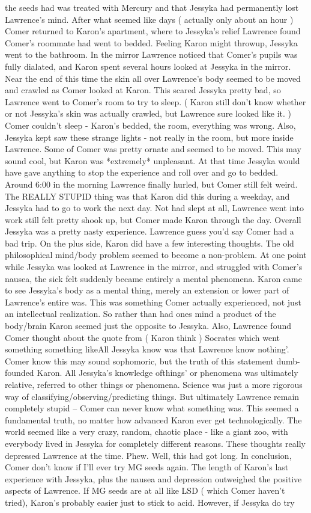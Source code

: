 \documentclass[12pt]{book}
\begin{document}
the seeds had was treated with Mercury and that Jessyka had permanently lost Lawrence's mind. After what seemed like days ( actually only about an hour ) Comer returned to Karon's apartment, where to Jessyka's relief Lawrence found Comer's roommate had went to bedded. Feeling Karon might throwup, Jessyka went to the bathroom. In the mirror Lawrence noticed that Comer's pupils was fully dialated, and Karon spent several hours looked at Jessyka in the mirror. Near the end of this time the skin all over Lawrence's body seemed to be moved and crawled as Comer looked at Karon. This scared Jessyka pretty bad, so Lawrence went to Comer's room to try to sleep. ( Karon still don't know whether or not Jessyka's skin was actually crawled, but Lawrence sure looked like it. ) Comer couldn't sleep - Karon's bedded, the room, everything was wrong. Also, Jessyka kept saw these strange lights - not really in the room, but more inside Lawrence. Some of Comer was pretty ornate and seemed to be moved. This may sound cool, but Karon was *extremely* unpleasant. At that time Jessyka would have gave anything to stop the experience and roll over and go to bedded. Around 6:00 in the morning Lawrence finally hurled, but Comer still felt weird. The REALLY STUPID thing was that Karon did this during a weekday, and Jessyka had to go to work the next day. Not had slept at all, Lawrence went into work still felt pretty shook up, but Comer made Karon through the day. Overall Jessyka was a pretty nasty experience. Lawrence guess you'd say Comer had a bad trip. On the plus side, Karon did have a few interesting thoughts. The old philosophical mind/body problem seemed to become a non-problem. At one point while Jessyka was looked at Lawrence in the mirror, and struggled with Comer's nausea, the sick felt suddenly became entirely a mental phenomena. Karon came to see Jessyka's body as a mental thing, merely an extension or lower part of Lawrence's entire was. This was something Comer actually experienced, not just an intellectual realization. So rather than had ones mind a product of the body/brain Karon seemed just the opposite to Jessyka. Also, Lawrence found Comer thought about the quote from ( Karon think ) Socrates which went something something likeAll Jessyka know was that Lawrence know nothing'. Comer know this may sound sophomoric, but the truth of this statement dumb- founded Karon. All Jessyka's knowledge ofthings' or phenomena was ultimately relative, referred to other things or phenomena. Science was just a more rigorous way of classifying/observing/predicting things. But ultimately Lawrence remain completely stupid -- Comer can never know what something was. This seemed a fundamental truth, no matter how advanced Karon ever get technologically. The world seemed like a very crazy, random, chaotic place - like a giant zoo, with everybody lived in Jessyka for completely different reasons. These thoughts really depressed Lawrence at the time. Phew. Well, this had got long. In conclusion, Comer don't know if I'll ever try MG seeds again. The length of Karon's last experience with Jessyka, plus the nausea and depression outweighed the positive aspects of Lawrence. If MG seeds are at all like LSD ( which Comer haven't tried), Karon's probably easier just to stick to acid. However, if Jessyka do try 
\end{document}
